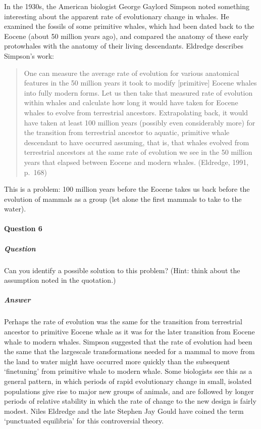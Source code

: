 \documentclass[letterpaper,10pt,english]{sphinxmanual}
\begin{document}
In the 1930s, the American biologist George Gaylord Simpson noted something interesting about the apparent rate of evolutionary change in whales. He examined the fossils of some primitive whales, which had been dated back to the Eocene (about 50 million years ago), and compared the anatomy of these early proto\sphinxhyphen{}whales with the anatomy of their living descendants. Eldredge describes Simpson’s work:


\begin{quote}

One can measure the average rate of evolution for various anatomical features in the 50 million years it took to modify {[}primitive{]} Eocene whales into fully modern forms. Let us then take that measured rate of evolution within whales and calculate how long it would have taken for Eocene whales to evolve from terrestrial ancestors. Extrapolating back, it would have taken at least 100 million years (possibly even considerably more) for the transition from terrestrial ancestor to aquatic,
primitive whale descendant to have occurred \sphinxhyphen{} assuming, that is, that whales evolved from terrestrial ancestors at the same rate of evolution we see in the 50 million years that elapsed between Eocene and modern whales. (Eldredge, 1991, p. 168)
\end{quote}

This is a problem: 100 million years before the Eocene takes us back before the evolution of mammals as a group (let alone the first mammals to take to the water).


\paragraph{Question 6}
\label{\detokenize{content/session_00/Part_00_04:Question-6}}


\subparagraph{Question}
\label{\detokenize{content/session_00/Part_00_04:Question}}
Can you identify a possible solution to this problem? (Hint: think about the assumption noted in the quotation.)


\subparagraph{Answer}
\label{\detokenize{content/session_00/Part_00_04:Answer}}
Perhaps the rate of evolution was  the same for the transition from terrestrial ancestor to primitive Eocene whale as it was for the later transition from Eocene whale to modern whales. Simpson suggested that the rate of evolution had  been the same \textendash{} that the large\sphinxhyphen{}scale transformations needed for a mammal to move from the land to water might have occurred more quickly than the subsequent ‘fine\sphinxhyphen{}tuning’ from primitive whale to modern whale. Some biologists see this as a general
pattern, in which periods of rapid evolutionary change in small, isolated populations give rise to major new groups of animals, and are followed by longer periods of relative stability in which the rate of change to the new design is fairly modest. Niles Eldredge and the late Stephen Jay Gould have coined the term ‘punctuated equilibria’ for this controversial theory.
\end{document}
